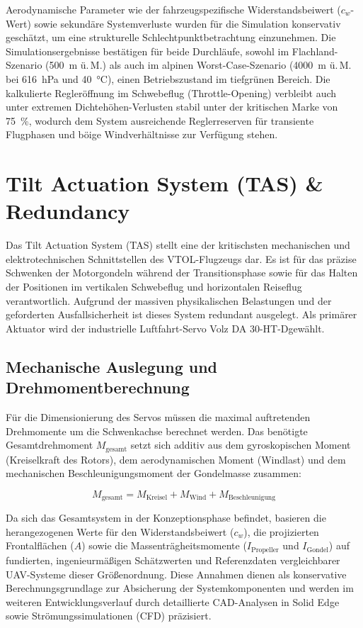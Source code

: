 \noindent
Aerodynamische Parameter wie der fahrzeugspezifische Widerstandsbeiwert ($c_w$-Wert) sowie sekundäre Systemverluste wurden für die Simulation konservativ geschätzt, um eine strukturelle Schlechtpunktbetrachtung einzunehmen. Die Simulationsergebnisse bestätigen für beide Durchläufe, sowohl im Flachland-Szenario (\SI{500}{\meter} ü.\,M.) als auch im alpinen Worst-Case-Szenario (\SI{4000}{\meter} ü.\,M. bei \SI{616}{\hecto\pascal} und \SI{40}{\celsius}), einen Betriebszustand im tiefgrünen Bereich. Die kalkulierte Regleröffnung im Schwebeflug (Throttle-Opening) verbleibt auch unter extremen Dichtehöhen-Verlusten stabil unter der kritischen Marke von \SI{75}{\percent}, wodurch dem System ausreichende Reglerreserven für transiente Flugphasen und böige Windverhältnisse zur Verfügung stehen.

\section{Tilt Actuation System (TAS) \& Redundancy}

\noindent
Das Tilt Actuation System (TAS) stellt eine der kritischsten mechanischen und elektrotechnischen Schnittstellen des VTOL-Flugzeugs dar. Es ist für das präzise Schwenken der Motorgondeln während der Transitionsphase sowie für das Halten der Positionen im vertikalen Schwebeflug und horizontalen Reiseflug verantwortlich. Aufgrund der massiven physikalischen Belastungen und der geforderten Ausfallsicherheit ist dieses System redundant ausgelegt. Als primärer Aktuator wird der industrielle Luftfahrt-Servo Volz DA 30-HT-Dgewählt.

\subsection{Mechanische Auslegung und Drehmomentberechnung}
\noindent
Für die Dimensionierung des Servos müssen die maximal auftretenden Drehmomente um die Schwenkachse berechnet werden. Das benötigte Gesamtdrehmoment $M_{\text{gesamt}}$ setzt sich additiv aus dem gyroskopischen Moment (Kreiselkraft des Rotors), dem aerodynamischen Moment (Windlast) und dem mechanischen Beschleunigungsmoment der Gondelmasse zusammen:

\begin{equation}
M_{\text{gesamt}} = M_{\text{Kreisel}} + M_{\text{Wind}} + M_{\text{Beschleunigung}}
\end{equation}

\noindent
Da sich das Gesamtsystem in der Konzeptionsphase befindet, basieren die herangezogenen Werte für den Widerstandsbeiwert ($c_w$), die projizierten Frontalflächen ($A$) sowie die Massenträgheitsmomente ($I_{\text{Propeller}}$ und $I_{\text{Gondel}}$) auf fundierten, ingenieurmäßigen Schätzwerten und Referenzdaten vergleichbarer UAV-Systeme dieser Größenordnung. Diese Annahmen dienen als konservative Berechnungsgrundlage zur Absicherung der Systemkomponenten und werden im weiteren Entwicklungsverlauf durch detaillierte CAD-Analysen in Solid Edge sowie Strömungssimulationen (CFD) präzisiert.

